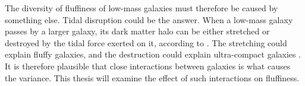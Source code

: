 The diversity of fluffiness of low-mass galaxies must therefore be caused by something else. Tidal disruption could be the answer. When a low-mass galaxy passes by a larger galaxy, its dark matter halo can be either stretched or destroyed by the tidal force exerted on it, according to \cite{morenoGalaxiesLackingDark2022}. The stretching could explain fluffy galaxies, and the destruction could explain ultra-compact galaxies \citep{applebaumUltrafaintDwarfsMilky2021}. It is therefore plausible that close interactions between galaxies is what causes the variance. This thesis will examine the effect of such interactions on fluffiness.